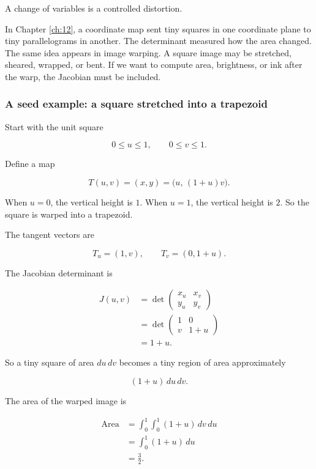A change of variables is a controlled distortion.

In Chapter \ref{ch:12}, a coordinate map sent tiny squares in one coordinate plane to
tiny parallelograms in another.  The determinant measured how the area changed.  The
same idea appears in image warping.  A square image may be stretched, sheared,
wrapped, or bent.  If we want to compute area, brightness, or ink after the warp, the
Jacobian must be included.

\subsubsection*{A seed example: a square stretched into a trapezoid}

Start with the unit square

\[
    0\le u\le1,
    \qquad
    0\le v\le1.
\]

Define a map

\[
    T(u,v)=(x,y)=\bigl(u,\,(1+u)v\bigr).
\]

When \(u=0\), the vertical height is \(1\).  When \(u=1\), the vertical height is \(2\).
So the square is warped into a trapezoid.

The tangent vectors are

\[
    T_u=(1,v),
    \qquad
    T_v=(0,1+u).
\]

The Jacobian determinant is

\[
\begin{aligned}
J(u,v)
&=
\det
\begin{pmatrix}
x_u & x_v\\
y_u & y_v
\end{pmatrix}       \\
&=
\det
\begin{pmatrix}
1&0\\
v&1+u
\end{pmatrix}\\
&=
1+u.
\end{aligned}
\]

So a tiny square of area \(du\,dv\) becomes a tiny region of area approximately

\[
    (1+u)\,du\,dv.
\]

The area of the warped image is

\[
\begin{aligned}
\operatorname{Area}
&=
\int_0^1\int_0^1 (1+u)\,dv\,du\\
&=
\int_0^1(1+u)\,du\\
&=
\frac32.
\end{aligned}
\]

